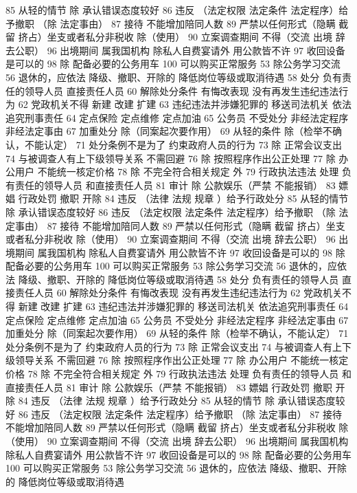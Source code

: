 \documentclass[11pt]{ctexart}
\begin{document}
85 从轻的情节
除 承认错误态度较好
86 违反 （法定权限 法定条件 法定程序）给予撤职
（除 法定事由）
87 接待 不能增加陪同人数
89 严禁以任何形式（隐瞒 截留 挤占）坐支或者私分非税收
除（使用）
90 立案调查期间 不得（交流 出境 辞去公职）
96 出境期间 属我国机构 除私人自费宴请外 用公款皆不许
97 收回设备是可以的
98 除 配备必要的公务用车
100 可以购买正常服务
53 除公务学习交流
56 退休的，应依法
降级、撤职、开除的 降低岗位等级或取消待遇
58 处分
负有责任的领导人员
直接责任人员
60 解除处分条件
有悔改表现
没有再发生违纪违法行为
62 党政机关不得
新建 改建 扩建
63 违纪违法并涉嫌犯罪的
移送司法机关
依法追究刑事责任
64 定点保险 定点维修 定点加油
65 公务员 不受处分
非经法定程序
非经法定事由
67 加重处分
除（同案起次要作用）
69 从轻的条件
除（检举不确认，不能认定）
71 处分条例不是为了
约束政府人员的行为
73 除 正常会议支出
74 与被调查人有上下级领导关系 不需回避
76 除 按照程序作出公正处理
77 除 办公用户
不能统一核定价格
78 除 不完全符合相关规定 外
79 行政执法违法 处理
负有责任的领导人员
和直接责任人员
81 审计
除 公款娱乐（严禁 不能报销）
83 嫖娼 行政处罚
撤职 开除
84 违反 （法律 法规 规章 ）给予行政处分
85 从轻的情节
除 承认错误态度较好
86 违反 （法定权限 法定条件 法定程序）给予撤职
（除 法定事由）
87 接待 不能增加陪同人数
89 严禁以任何形式（隐瞒 截留 挤占）坐支或者私分非税收
除（使用）
90 立案调查期间 不得（交流 出境 辞去公职）
96 出境期间 属我国机构 除私人自费宴请外 用公款皆不许
97 收回设备是可以的
98 除 配备必要的公务用车
100 可以购买正常服务
53 除公务学习交流
56 退休的，应依法
降级、撤职、开除的 降低岗位等级或取消待遇
58 处分
负有责任的领导人员
直接责任人员
60 解除处分条件
有悔改表现
没有再发生违纪违法行为
62 党政机关不得
新建 改建 扩建
63 违纪违法并涉嫌犯罪的
移送司法机关
依法追究刑事责任
64 定点保险 定点维修 定点加油
65 公务员 不受处分
非经法定程序
非经法定事由
67 加重处分
除（同案起次要作用）
69 从轻的条件
除（检举不确认，不能认定）
71 处分条例不是为了
约束政府人员的行为
73 除 正常会议支出
74 与被调查人有上下级领导关系 不需回避
76 除 按照程序作出公正处理
77 除 办公用户
不能统一核定价格
78 除 不完全符合相关规定 外
79 行政执法违法 处理
负有责任的领导人员
和直接责任人员
81 审计
除 公款娱乐（严禁 不能报销）
83 嫖娼 行政处罚
撤职 开除
84 违反 （法律 法规 规章 ）给予行政处分
85 从轻的情节
除 承认错误态度较好
86 违反 （法定权限 法定条件 法定程序）给予撤职
（除 法定事由）
87 接待 不能增加陪同人数
89 严禁以任何形式（隐瞒 截留 挤占）坐支或者私分非税收
除（使用）
90 立案调查期间 不得（交流 出境 辞去公职）
96 出境期间 属我国机构 除私人自费宴请外 用公款皆不许
97 收回设备是可以的
98 除 配备必要的公务用车
100 可以购买正常服务
53 除公务学习交流
56 退休的，应依法
降级、撤职、开除的 降低岗位等级或取消待遇
\end{document}
